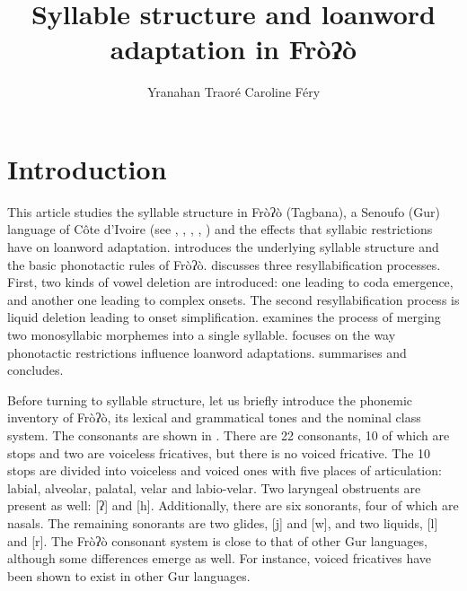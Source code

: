 \documentclass[output=paper]{langscibook}
\author{Yranahan Traoré  \lastand Caroline Féry \affiliation{University of Frankfurt}}
\title{Syllable structure and loanword adaptation in Fròʔò}
\begin{document}
\maketitle

\section{Introduction}
\label{sec:traore:introduction:1}

This article studies the syllable structure in Fròʔò (Tagbana), a Senoufo (Gur) language of Côte d’Ivoire (see \citealt{Clamens1952}, \citealt{Manessy1962}, \citealt{Herault1973}, \citealt{Miehe2012}, \citealt{MieheEtAl2012}) and the effects that syllabic restrictions have on loanword adaptation.  introduces the underlying syllable structure and the basic phonotactic rules of Fròʔò.  discusses three resyllabification processes. First, two kinds of vowel deletion are introduced: one leading to coda emergence, and another one leading to complex onsets.  The second resyllabification process is liquid deletion leading to onset simplification.  examines the process of merging two monosyllabic morphemes into a single syllable.  focuses on the way phonotactic restrictions influence loanword adaptations.  summarises and concludes.

Before turning to syllable structure, let us briefly introduce the phonemic inventory of Fròʔò, its lexical and grammatical tones and the nominal class system. The consonants are shown in . 
There are 22 consonants, 10 of which are stops and two are voiceless fricatives, but there is no voiced fricative. The 10 stops are divided into voiceless and voiced ones with five places of articulation: labial, alveolar, palatal, velar and labio-velar. Two laryngeal obstruents are present as well: [ʔ] and [h]. Additionally, there are six sonorants, four of which are nasals. The remaining sonorants are two glides, [j] and [w], and two liquids, [l] and [r]. The Fròʔò consonant system is close to that of other ​​Gur languages, although some differences emerge as well. For instance, voiced fricatives have been shown to exist in other Gur languages.
\end{document}

